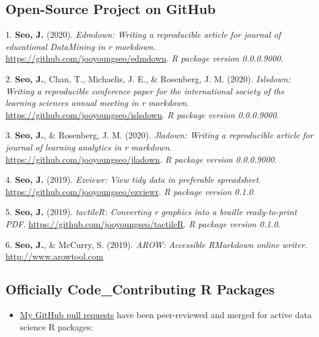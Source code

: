 \documentclass[11pt,a4paper,]{awesome-cv}
\providecommand{\tightlist}{%
	\setlength{\itemsep}{0pt}\setlength{\parskip}{0pt}}
\newlength{\cslhangindent}
\newenvironment{CSLReferences}[2] %
 {\begin{list}{}{%
  \setlength{\itemindent}{0pt}
  \setlength{\leftmargin}{0pt}
  \setlength{\parsep}{0pt}
  \ifodd #1
   \setlength{\leftmargin}{\cslhangindent}
   \setlength{\itemindent}{-1\cslhangindent}
  \fi
  \setlength{\itemsep}{#2\baselineskip}}}
 {\end{list}}
\begin{document}
\newpage

\subsection{Open-Source Project on
GitHub}\label{open-source-project-on-github}

\label{refs-2061fa253ba446d2f8d9d3810e4746e6}
\begin{CSLReferences}{1}{0}
1. \textbf{Seo, J.} (2020). \emph{Edmdown: Writing a reproducible
article for journal of educational DataMining in r markdown}.
\url{https://github.com/jooyoungseo/edmdown}. \emph{R package version
0.0.0.9000}.

2. \textbf{Seo, J.}, Chan, T., Michaelis, J. E., \& Rosenberg, J. M.
(2020). \emph{Islsdown: Writing a reproducible conference paper for the
international society of the learning sciences annual meeting in r
markdown}. \url{https://github.com/jooyoungseo/islsdown}. \emph{R
package version 0.0.0.9000}.

3. \textbf{Seo, J.}, \& Rosenberg, J. M. (2020). \emph{Jladown: Writing
a reproducible article for journal of learning analytics in r markdown}.
\url{https://github.com/jooyoungseo/jladown}. \emph{R package version
0.0.0.9000}.

4. \textbf{Seo, J.} (2019). \emph{Ezviewr: View tidy data in preferable
spreadsheet}. \url{https://github.com/jooyoungseo/ezviewr}. \emph{R
package version 0.1.0}.

5. \textbf{Seo, J.} (2019). \emph{tactileR: Converting r graphics into a
braille ready-to-print PDF}.
\url{https://github.com/jooyoungseo/tactileR}. \emph{R package version
0.1.0}.

6. \textbf{Seo, J.}, \& McCurry, S. (2019). \emph{AROW: Accessible
RMarkdown online writer}. \url{http://www.arowtool.com}

\end{CSLReferences}

\subsection{Officially Code\_Contributing R
Packages}\label{officially-code_contributing-r-packages}

\begin{itemize}
\tightlist
\item
  \href{https://github.com/pulls?q=is\%3Apr+author\%3Ajooyoungseo+archived\%3Afalse+is\%3Aclosed}{My
  GitHub pull requests} have been peer-reviewed and merged for active
  data science R packages:
\end{itemize}
\end{document}
